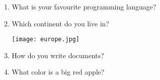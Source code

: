 \documentclass[12pt,onside,a4paper,article]{memoir}
\newcommand\blankpage{%
    \null
    \thispagestyle{empty}%
    \addtocounter{page}{-1}%
    \newpage}
\begin{document}
\clearpage\blankpage
\begin{enumerate}

\item{What is your favourite programming language?}
\begin{flushright}
\end{flushright}
\item{Which continent do you live in?}
\begin{flushright}
\end{flushright}
\begin{flushleft}
\texttt{[image: europe.jpg]}
\end{flushleft}
\item{How do you write documents?}
\begin{flushright}
\end{flushright}
\item{What color is a big red apple?}
\begin{flushright}
\end{flushright}
\end{enumerate}

\vspace*{4.5cm}
\begin{flushright}
 \end{flushright}

\clearpage\blankpage
\end{document}
